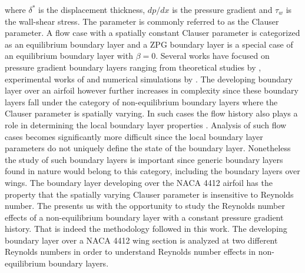where $\delta^{*}$ is the displacement thickness, $dp/dx$ is the pressure gradient and $\tau_{w}$ is the wall-shear stress. The parameter is commonly referred to as the Clauser parameter. A flow case with a spatially constant Clauser parameter is categorized as an equilibrium boundary layer and a ZPG boundary layer is a special case of an equilibrium boundary layer with $\beta=0$. Several works have focused on pressure gradient boundary layers ranging from theoretical studies by \cite{townsend56,townsend56b,mellor66}, experimental works of \cite{skare94,harun13} and numerical simulations by \cite{spalart93,skote98}. The developing boundary layer over an airfoil however further increases in complexity since these boundary layers fall under the category of non-equilibrium boundary layers where the Clauser parameter is spatially varying. In such cases the flow history also plays a role in determining the local boundary layer properties \citep{clauser54,bobke17}. Analysis of such flow cases becomes significantly more difficult since the local boundary layer parameters do not uniquely define the state of the boundary layer. Nonetheless the study of such boundary layers is important since generic boundary layers found in nature would belong to this category, including the boundary layers over wings. The boundary layer developing over the NACA 4412 airfoil has the property that the spatially varying Clauser parameter is insensitive to Reynolds number. The presents us with the opportunity to study the Reynolds number effects of a non-equilibrium boundary layer with a constant pressure gradient history. That is indeed the methodology followed in this work. The developing boundary layer over a NACA 4412 wing section is analyzed at two different Reynolds numbers in order to understand Reynolds number effects in non-equilibrium boundary layers.

